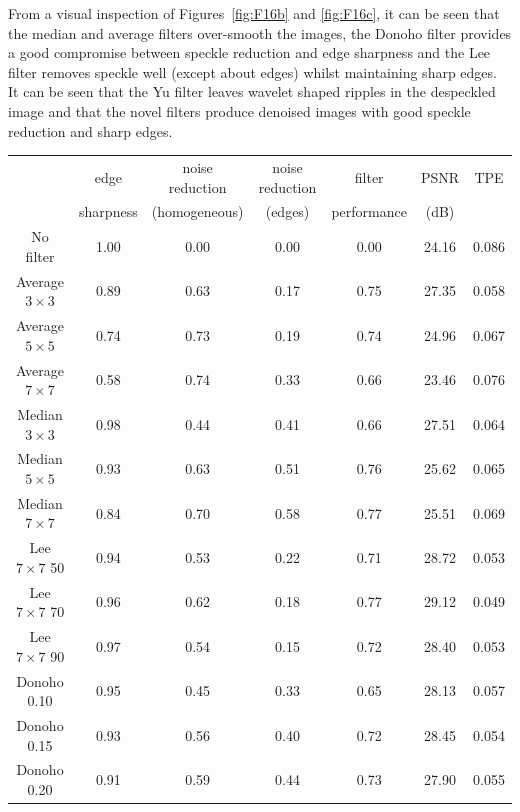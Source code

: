 \documentclass[12pt]{report}
\renewcommand{\baselinestretch}{1.5}
\begin{document}
From a visual inspection of Figures~\ref{fig:F16b} and \ref{fig:F16c}, it can be seen that the median and average 
filters over-smooth the images,
the Donoho filter provides a good compromise between speckle reduction and edge sharpness and
the Lee filter removes speckle well (except about edges) whilst maintaining sharp edges. 
It can be seen that the Yu filter
leaves wavelet shaped ripples in the despeckled image and that the novel filters produce denoised images with 
good speckle reduction and sharp edges. 

\begin{table}[p]
\setlength{\abovecaptionskip}{-0.25cm}
\renewcommand{\baselinestretch}{1.0}
\begin{center}
\begin{scriptsize}
\begin{tabular}{|c|c|c|c|c|c|c|} \hline
			& edge		& noise reduction & noise reduction 	& filter& PSNR 		& TPE	\\
			& sharpness	& (homogeneous)	  & (edges)		& performance & (dB)	&	\\ \hline \hline

No filter		& 1.00	& 0.00		& 0.00		& 0.00	& 24.16		& 0.086		\\ \hline \hline

Average $3 \times 3$	& 0.89	& 0.63		& 0.17		& 0.75	& 27.35		& 0.058		\\ \hline
Average $5 \times 5$ 	& 0.74	& 0.73		& 0.19		& 0.74	& 24.96		& 0.067		\\ \hline
Average $7 \times 7$ 	& 0.58	& 0.74		& 0.33		& 0.66	& 23.46		& 0.076		\\ \hline \hline

Median $3 \times 3$	& 0.98	& 0.44		& 0.41		& 0.66	& 27.51		& 0.064		\\ \hline
Median $5 \times 5$	& 0.93	& 0.63		& 0.51		& 0.76	& 25.62		& 0.065		\\ \hline
Median $7 \times 7$	& 0.84	& 0.70		& 0.58		& 0.77	& 25.51		& 0.069		\\ \hline \hline

Lee $7 \times 7$ 50	& 0.94 	& 0.53		& 0.22		& 0.71	& 28.72		& 0.053		\\ \hline
Lee $7 \times 7$ 70	& 0.96	& 0.62		& 0.18		& 0.77	& 29.12		& 0.049		\\ \hline
Lee $7 \times 7$ 90	& 0.97	& 0.54		& 0.15		& 0.72	& 28.40		& 0.053		\\ \hline \hline

Donoho 0.10		& 0.95	& 0.45		& 0.33		& 0.65	& 28.13		& 0.057		\\ \hline
Donoho 0.15		& 0.93	& 0.56		& 0.40		& 0.72	& 28.45 	& 0.054		\\ \hline
Donoho 0.20		& 0.91	& 0.59		& 0.44		& 0.73	& 27.90		& 0.055		\\ \hline \hline


\end{tabular}
\end{scriptsize}
\end{center}
\end{table}
\end{document}
